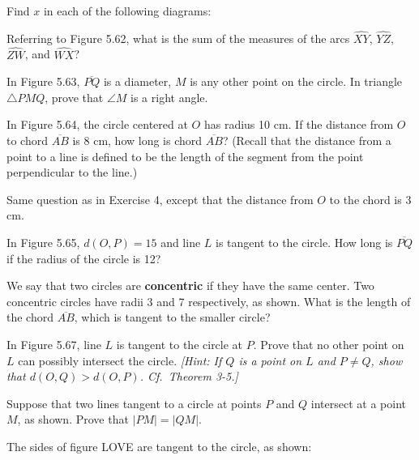 \documentclass[12pt]{book} %
\begin{document}
\setcounter{Exercise}{0}
\begin{ExerciseList}
\Exercise Find $x$ in each of the following diagrams:


\Exercise Referring to Figure 5.62, what is the sum of the measures of the arcs $\widehat{XY}$, $\widehat{YZ}$, $\widehat{ZW}$, and $\widehat{WX}$?


\Exercise In Figure 5.63, $\overline{PQ}$ is a diameter, $M$ is any other point on the circle. In triangle $\triangle PMQ$, prove that $\angle M$ is a right angle.


\Exercise In Figure 5.64, the circle centered at $O$ has radius 10 cm. If the distance from $O$ to chord $\overline{AB}$ is 8 cm, how long is chord $\overline{AB}$? (Recall that the distance from a point to a line is defined to be the length of the segment from the point perpendicular to the line.)


\Exercise Same question as in Exercise 4, except that the distance from $O$ to the chord is 3 cm.

\Exercise In Figure 5.65, $d(O,P)=15$ and line $L$ is tangent to the circle. How long is $\overline{PQ}$ if the radius of the circle is 12?


\Exercise We say that two circles are \textbf{concentric} if they have the same center. Two concentric circles have radii 3 and 7 respectively, as shown. What is the length of the chord $\overline{AB}$, which is tangent to the smaller circle?


\Exercise In Figure 5.67, line $L$ is tangent to the circle at $P$. Prove that no other point on $L$ can possibly intersect the circle. \textit{[Hint: If $Q$ is a point on $L$ and $P\ne Q$, show that $d(O,Q)>d(O,P)$. Cf.\ Theorem 3-5.]}


\Exercise Suppose that two lines tangent to a circle at points $P$ and $Q$ intersect at a point $M$, as shown. Prove that $|PM|=|QM|$.


\Exercise The sides of figure LOVE are tangent to the circle, as shown:


\end{ExerciseList}
\end{document}
